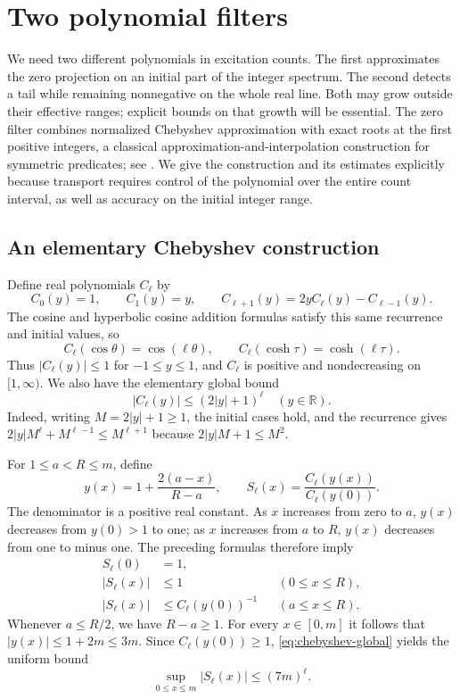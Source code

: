 \section{Two polynomial filters}
\label{sec:filters}

We need two different polynomials in excitation counts.  The first
approximates the zero projection on an initial part of the integer spectrum.
The second detects a tail while remaining nonnegative on the whole real
line.  Both may grow outside their effective ranges; explicit bounds on
that growth will be essential. The zero filter combines normalized
Chebyshev approximation with exact roots at the first positive integers,
a classical approximation-and-interpolation construction for symmetric
predicates; see \citet[Section~3.1 and Lemma~3.9]{Sherstov2009}.
We give the construction and its estimates explicitly because transport
requires control of the polynomial over the entire count interval,
as well as accuracy on the initial integer range.

\subsection{An elementary Chebyshev construction}

Define real polynomials $C_\ell$ by
\[
 C_0(y)=1,\qquad C_1(y)=y,\qquad
 C_{\ell+1}(y)=2yC_\ell(y)-C_{\ell-1}(y).
\]
The cosine and hyperbolic cosine addition formulas satisfy this same
recurrence and initial values, so
\[
 C_\ell(\cos\theta)=\cos(\ell\theta),
 \qquad
 C_\ell(\cosh\tau)=\cosh(\ell\tau).
\]
Thus $|C_\ell(y)|\le1$ for $-1\le y\le1$, and $C_\ell$ is positive
and nondecreasing on $[1,\infty)$.  We also have the elementary global
bound
\begin{equation}
 |C_\ell(y)|\le(2|y|+1)^\ell
 \quad(y\in\mathbb R).
 \label{eq:chebyshev-global}
\end{equation}
Indeed, writing $M=2|y|+1\ge1$, the initial cases hold, and the
recurrence gives
$2|y|M^\ell+M^{\ell-1}\le M^{\ell+1}$ because
$2|y|M+1\le M^2$.

For $1\le a<R\le m$, define
\[
 y(x)=1+\frac{2(a-x)}{R-a},\qquad
 S_\ell(x)=\frac{C_\ell(y(x))}{C_\ell(y(0))}.
\]
The denominator is a positive real constant.  As $x$ increases from zero
to $a$, $y(x)$ decreases from $y(0)>1$ to one; as $x$ increases from $a$
to $R$, $y(x)$ decreases from one to minus one.  The preceding formulas
therefore imply
\begin{equation}
 \begin{aligned}
 S_\ell(0)&=1,\\
 |S_\ell(x)|&\le1 &&(0\le x\le R),\\
 |S_\ell(x)|&\le C_\ell(y(0))^{-1} &&(a\le x\le R).
 \end{aligned}
 \label{eq:normalized-chebyshev}
\end{equation}
Whenever $a\le R/2$, we have $R-a\ge1$.  For every $x\in[0,m]$ it
follows that $|y(x)|\le1+2m\le3m$.  Since $C_\ell(y(0))\ge1$,
\eqref{eq:chebyshev-global} yields the uniform bound
\begin{equation}
 \sup_{0\le x\le m}|S_\ell(x)|\le(7m)^\ell.
 \label{eq:normalized-global}
\end{equation}

